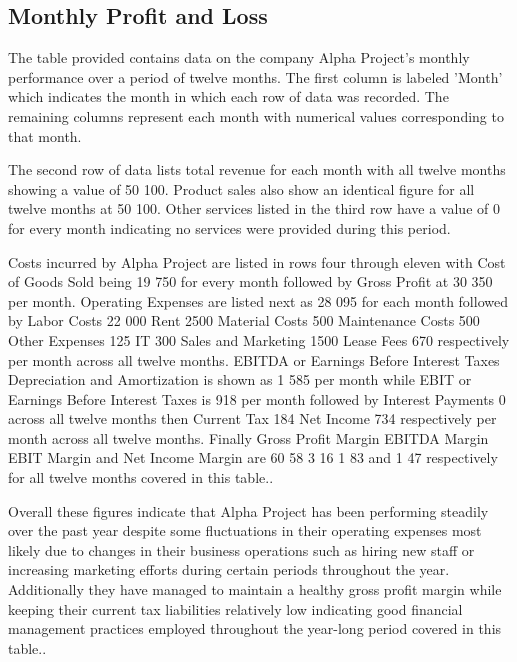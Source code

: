 

\subsection{Monthly Profit and Loss \label{sec:title}}

The table provided contains data on the company Alpha Project's monthly performance over a period of twelve months. The first column is labeled 'Month' which indicates the month in which each row of data was recorded. The remaining columns represent each month with numerical values corresponding to that month. 

The second row of data lists total revenue for each month with all twelve months showing a value of 50 100. Product sales also show an identical figure for all twelve months at 50 100. Other services listed in the third row have a value of 0 for every month indicating no services were provided during this period. 

Costs incurred by Alpha Project are listed in rows four through eleven with Cost of Goods Sold being 19 750 for every month followed by Gross Profit at 30 350 per month. Operating Expenses are listed next as 28 095 for each month followed by Labor Costs 22 000 Rent 2500 Material Costs 500 Maintenance Costs 500 Other Expenses 125 IT 300 Sales and Marketing 1500 Lease Fees 670 respectively per month across all twelve months. 
EBITDA or Earnings Before Interest Taxes Depreciation and Amortization is shown as 1 585 per month while EBIT or Earnings Before Interest Taxes is 918 per month followed by Interest Payments 0 across all twelve months then Current Tax 184 Net Income 734 respectively per month across all twelve months. Finally Gross Profit Margin EBITDA Margin EBIT Margin and Net Income Margin are 60 58 3 16 1 83 and 1 47 respectively for all twelve months covered in this table.. 

Overall these figures indicate that Alpha Project has been performing steadily over the past year despite some fluctuations in their operating expenses most likely due to changes in their business operations such as hiring new staff or increasing marketing efforts during certain periods throughout the year. Additionally they have managed to maintain a healthy gross profit margin while keeping their current tax liabilities relatively low indicating good financial management practices employed throughout the year-long period covered in this table..